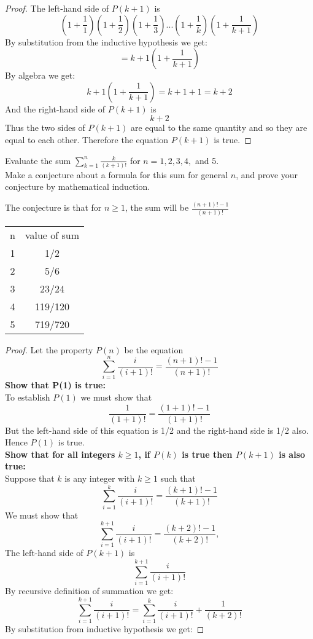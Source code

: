 \documentclass[12pt,letterpaper, onecolumn]{exam}
\begin{document}
\begin{questions}
\begin{solution}
\begin{proof}
		 		The left-hand side of $P(k+1)$ is
		 		$$(1+\frac{1}{1})(1+\frac{1}{2})(1+\frac{1}{3})...(1+\frac{1}{k})(1+\frac{1}{k+1})$$ 
		 		By substitution from the inductive hypothesis we get:
		 		$$=k+1(1+\frac{1}{k+1})$$
		 		By algebra we get:
		 		$$k+1(1+\frac{1}{k+1})=k+1+1=k+2$$
		 		And the right-hand side of $P(k+1)$ is
		 		$$k+2$$
		 		Thus the two sides of $P(k+1)$ are equal to the same quantity and so they are equal to each other. Therefore the equation $P(k+1)$ is true.
		 	\end{proof}
		 \end{solution}
		 \setcounter{question}{4}\question Evaluate the sum $\sum_{k=1}^{n}\frac{k}{(k+1)!}$ for $n=1,2,3,4,$ and 5.\\
		 Make a conjecture about a formula for this sum for general $n$, and prove your conjecture by mathematical induction.
		 \begin{solution}
		 	The conjecture is that for $n\geq1$, the sum will be $\frac{(n+1)!-1}{(n+1)!}$
		 	\begin{tabular}{c c}
				n&value of sum\\
				1&1/2\\
				2&5/6\\
				3&23/24\\
				4&119/120\\
				5&719/720\\
		 	\end{tabular}
		 	\begin{proof}
		 		Let the property $P(n)$ be the equation
		 		 $$\sum_{i=1}^{n}\frac{i}{(i+1)!}=\frac{(n+1)!-1}{(n+1)!}$$
		 		 	\textbf{Show that P(1) is true:}\\
		 		 To establish $P(1)$ we must show that
		 		 $$\frac{1}{(1+1)!}=\frac{(1+1)!-1}{(1+1)!}$$
		 		 But the left-hand side of this equation is 1/2 and the right-hand side is 1/2
		 		 also. Hence $P(1)$ is true.\\
		 		 \textbf{Show that for all integers $k\geq1$, if $P(k)$ is true then $P(k+1)$ is also true:}\\
		 		 Suppose that $k$ is any integer with $k\geq1$ such that
		 		 $$\sum_{i=1}^{k}\frac{i}{(i+1)!}=\frac{(k+1)!-1}{(k+1)!}$$
		 		 We must show that
		 		 $$\sum_{i=1}^{k+1}\frac{i}{(i+1)!}=\frac{(k+2)!-1}{(k+2)!},$$
		 		 The left-hand side of $P(k+1)$ is
		 		 $$\sum_{i=1}^{k+1}\frac{i}{(i+1)!}$$ 
		 		 By recursive definition of summation we get:
		 		 $$\sum_{i=1}^{k+1}\frac{i}{(i+1)!}=\sum_{i=1}^{k}\frac{i}{(i+1)!}+\frac{1}{(k+2)!}$$
		 		 By substitution from inductive hypothesis we get:

\end{proof}
\end{solution}
\end{questions}
\end{document}

